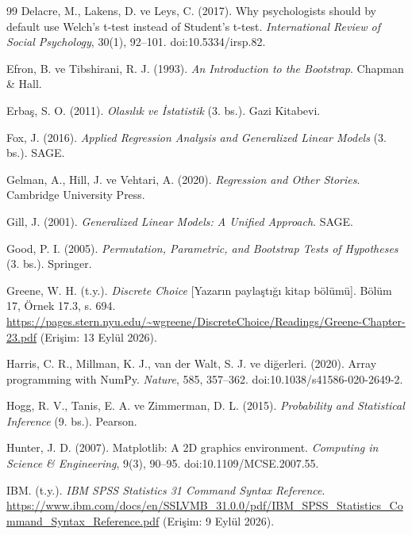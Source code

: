\begin{thebibliography}{99}
Delacre, M., Lakens, D. ve Leys, C. (2017). Why psychologists should by
default use Welch's t-test instead of Student's t-test.
\textit{International Review of Social Psychology}, 30(1), 92--101.
doi:10.5334/irsp.82.

\ifimoders\else
{}
Efron, B. ve Tibshirani, R. J. (1993).
\textit{An Introduction to the Bootstrap}. Chapman \& Hall.
\fi

Erbaş, S. O. (2011).
\textit{Olasılık ve İstatistik} (3. bs.). Gazi Kitabevi.

\ifimoders\else
{}
Fox, J. (2016).
\textit{Applied Regression Analysis and Generalized Linear Models} (3. bs.).
SAGE.
\fi

Gelman, A., Hill, J. ve Vehtari, A. (2020).
\textit{Regression and Other Stories}. Cambridge University Press.

Gill, J. (2001).
\textit{Generalized Linear Models: A Unified Approach}. SAGE.

\ifimoders\else
{}
Good, P. I. (2005).
\textit{Permutation, Parametric, and Bootstrap Tests of Hypotheses}
(3. bs.). Springer.
\fi

Greene, W. H. (t.y.). \textit{Discrete Choice} [Yazarın paylaştığı kitap
bölümü]. Bölüm 17, Örnek 17.3, s. 694.
\url{https://pages.stern.nyu.edu/~wgreene/DiscreteChoice/Readings/Greene-Chapter-23.pdf}
(Erişim: 13 Eylül 2026).

Harris, C. R., Millman, K. J., van der Walt, S. J. ve diğerleri. (2020).
Array programming with NumPy. \textit{Nature}, 585, 357--362.
doi:10.1038/s41586-020-2649-2.

Hogg, R. V., Tanis, E. A. ve Zimmerman, D. L. (2015).
\textit{Probability and Statistical Inference} (9. bs.). Pearson.

Hunter, J. D. (2007). Matplotlib: A 2D graphics environment.
\textit{Computing in Science \& Engineering}, 9(3), 90--95.
doi:10.1109/MCSE.2007.55.

IBM. (t.y.). \textit{IBM SPSS Statistics 31 Command Syntax Reference}.
\url{https://www.ibm.com/docs/en/SSLVMB_31.0.0/pdf/IBM_SPSS_Statistics_Command_Syntax_Reference.pdf}
(Erişim: 9 Eylül 2026).


\end{thebibliography}
